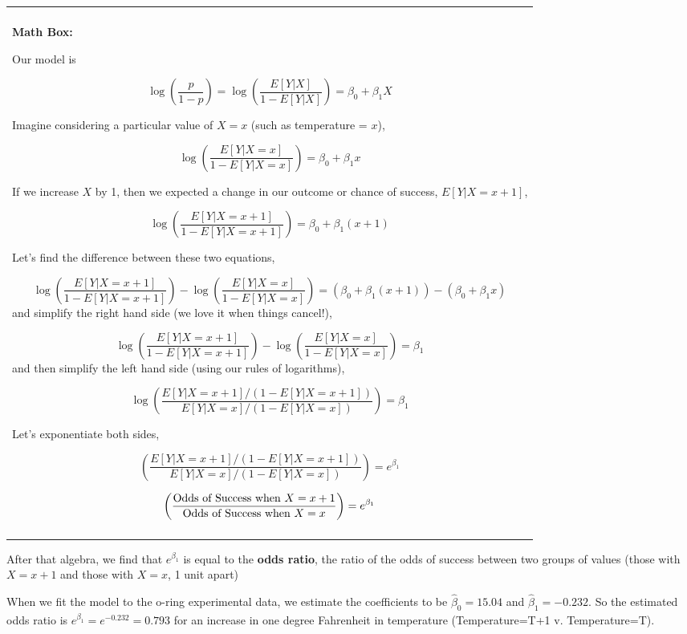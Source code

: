 \documentclass[
]{book}
\newenvironment{mathbox}
{
    \begin{center}
    
    \begin{tabular}{|p{0.8\textwidth}|}
    \rowcolor{LightYellow}
    \hline\\
    \rowcolor{LightYellow}
    \textbf{Math Box:}
}
{
    \\\rowcolor{LightYellow}
    \\\hline
    \end{tabular} 
    \end{center}
}
\begin{document}
\begin{mathbox}
Our model is

\[\log\left(\frac{p}{1-p}\right) = \log\left(\frac{E[Y|X]}{1-E[Y|X]}\right) = \beta_0 +\beta_1X\]

Imagine considering a particular value of \(X=x\) (such as temperature =
\(x\)),

\[\log\left(\frac{E[Y|X=x]}{1-E[Y|X=x]}\right) = \beta_0 +\beta_1x\]

If we increase \(X\) by 1, then we expected a change in our outcome or
chance of success, \(E[Y|X = x+1]\),

\[\log\left(\frac{E[Y|X= x+1]}{1-E[Y|X= x+1]}\right) = \beta_0 +\beta_1(x+1)\]

Let's find the difference between these two equations,

\[\log\left(\frac{E[Y|X=x+1]}{1-E[Y|X=x+1]}\right)- \log\left(\frac{E[Y|X=x]}{1-E[Y|X=x]}\right)=  (\beta_0 +\beta_1(x+1)) - ( \beta_0 +\beta_1x)\]
and simplify the right hand side (we love it when things cancel!),

\[\log\left(\frac{E[Y|X=x+1]}{1-E[Y|X=x+1]}\right)- \log\left(\frac{E[Y|X=x]}{1-E[Y|X=x]}\right)=  \beta_1\]
and then simplify the left hand side (using our rules of logarithms),

\[\log\left( \frac{E[Y|X=x+1]/(1-E[Y|X=x+1])}{E[Y|X=x]/(1-E[Y|X=x])}\right) = \beta_1\]

Let's exponentiate both sides,

\[\left( \frac{E[Y|X=x+1]/(1-E[Y|X=x+1])}{E[Y|X=x]/(1-E[Y|X=x])}\right)= e^{\beta_1}\]

\[\left( \frac{\hbox{Odds of Success when }X=x+1}{\hbox{Odds of Success when }X=x}\right)= e^{\beta_1}\]
\end{mathbox}

After that algebra, we find that \(e^{\beta_1}\) is equal to the \textbf{odds ratio}, the ratio of the odds of success between two groups of values (those with \(X=x+1\) and those with \(X=x\), 1 unit apart)

When we fit the model to the o-ring experimental data, we estimate the coefficients to be \(\hat{\beta}_0 = 15.04\) and \(\hat{\beta}_1 = -0.232\). So the estimated odds ratio is \(e^{\hat{\beta}_1} = e^{-0.232} = 0.793\) for an increase in one degree Fahrenheit in temperature (Temperature=T+1 v. Temperature=T).
\end{document}

